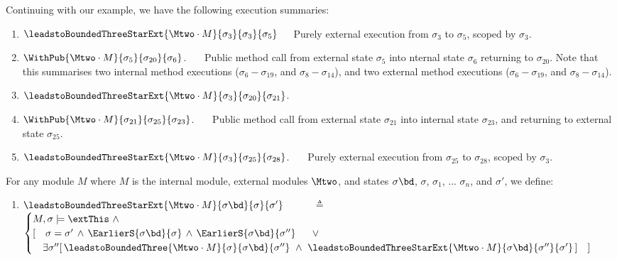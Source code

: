 {{  \noindent
Continuing with our example, we have the following execution summaries:
\begin{enumerate}
\item
${\leadstoBoundedThreeStarExt {\Mtwo\cdot M} {\sigma_3}  {\sigma_3}  {\sigma_5}}$\ \ \ 
Purely external execution from $\sigma_3$ to $\sigma_5$, scoped by $\sigma_3$.
\item
${\WithPub {\Mtwo\cdot M}    {\sigma_5}  {\sigma_{20}} {\sigma_{6}}}$. \ \ \ 
Public method call from external state $\sigma_5$ into  nternal state $\sigma_6$ returning to $\sigma_{20}$. 
Note that this   summarises two  internal method executions ($\sigma_{6}-\sigma_{19}$, and $\sigma_8-\sigma_{14}$),
and two external method executions ($\sigma_{6}-\sigma_{19}$, and $\sigma_8-\sigma_{14}$).
\item
 ${\leadstoBoundedThreeStarExt {\Mtwo\cdot M} {\sigma_3}  {\sigma_{20}}  {\sigma_{21}}}$.
 \item
${\WithPub {\Mtwo\cdot M}    {\sigma_{21}}  {\sigma_{25}} {\sigma_{23}}}$. \ \ \ 
Public method call from  external state ${\sigma_{21}}$ into internal state $\sigma_{23}$, and returning to external state $\sigma_{25}$.
 \item
  ${\leadstoBoundedThreeStarExt {\Mtwo\cdot M} {\sigma_3}  {\sigma_{25}}  {\sigma_{28}}}$.
\ \ \ 
  Purely external execution from $\sigma_{25}$ to $\sigma_{28}$, scoped by ${\sigma_3}$.
\end{enumerate}


\begin{definition}
\label{def:exec:sum}
For any module $M$  where $M$ is the internal module, external modules $\Mtwo$, and states $\sigma\bd$,  $\sigma$,  $\sigma_1$, ... $\sigma_n$, and $\sigma'$, we define:

\begin{enumerate}

\item
 ${\leadstoBoundedThreeStarExt {\Mtwo\cdot M} {\sigma\bd}  {\sigma}  {\sigma'}}$ \ \ \ \ \   $\triangleq$ \ \ 
$
\begin{cases}
M, \sigma  \models  \extThis\  \wedge\  \\
[ \ \ \ 
\sigma=\sigma' \, \wedge\,  \EarlierS  {\sigma\bd}  {\sigma} \, \wedge\,  \EarlierS  {\sigma\bd}  {\sigma''}\ \ \ \ \ \vee\\
\ \ \ \exists \sigma''[\,  \leadstoBoundedThree {\Mtwo\cdot M} {\sigma}  {\sigma\bd}   {\sigma''} \  \wedge\  
{\leadstoBoundedThreeStarExt {\Mtwo\cdot M} {\sigma\bd}  {\sigma''}  {\sigma'}}\, ] \ \ \ ]
\end{cases}
$


\end{enumerate}
\end{definition}}}
